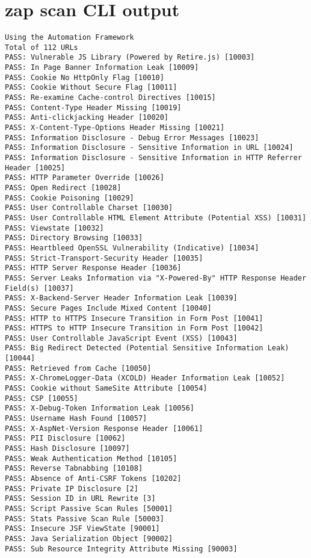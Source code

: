 \section{zap scan CLI output}
\vspace{2mm}
\begin{lstlisting}[caption=OWASP ZAP baseline scan, captionpos=b, frame=single, label={owasp-zap-cli-full-output}]
Using the Automation Framework
Total of 112 URLs
PASS: Vulnerable JS Library (Powered by Retire.js) [10003]
PASS: In Page Banner Information Leak [10009]
PASS: Cookie No HttpOnly Flag [10010]
PASS: Cookie Without Secure Flag [10011]
PASS: Re-examine Cache-control Directives [10015]
PASS: Content-Type Header Missing [10019]
PASS: Anti-clickjacking Header [10020]
PASS: X-Content-Type-Options Header Missing [10021]
PASS: Information Disclosure - Debug Error Messages [10023]
PASS: Information Disclosure - Sensitive Information in URL [10024]
PASS: Information Disclosure - Sensitive Information in HTTP Referrer Header [10025]
PASS: HTTP Parameter Override [10026]
PASS: Open Redirect [10028]
PASS: Cookie Poisoning [10029]
PASS: User Controllable Charset [10030]
PASS: User Controllable HTML Element Attribute (Potential XSS) [10031]
PASS: Viewstate [10032]
PASS: Directory Browsing [10033]
PASS: Heartbleed OpenSSL Vulnerability (Indicative) [10034]
PASS: Strict-Transport-Security Header [10035]
PASS: HTTP Server Response Header [10036]
PASS: Server Leaks Information via "X-Powered-By" HTTP Response Header Field(s) [10037]
PASS: X-Backend-Server Header Information Leak [10039]
PASS: Secure Pages Include Mixed Content [10040]
PASS: HTTP to HTTPS Insecure Transition in Form Post [10041]
PASS: HTTPS to HTTP Insecure Transition in Form Post [10042]
PASS: User Controllable JavaScript Event (XSS) [10043]
PASS: Big Redirect Detected (Potential Sensitive Information Leak) [10044]
PASS: Retrieved from Cache [10050]
PASS: X-ChromeLogger-Data (XCOLD) Header Information Leak [10052]
PASS: Cookie without SameSite Attribute [10054]
PASS: CSP [10055]
PASS: X-Debug-Token Information Leak [10056]
PASS: Username Hash Found [10057]
PASS: X-AspNet-Version Response Header [10061]
PASS: PII Disclosure [10062]
PASS: Hash Disclosure [10097]
PASS: Weak Authentication Method [10105]
PASS: Reverse Tabnabbing [10108]
PASS: Absence of Anti-CSRF Tokens [10202]
PASS: Private IP Disclosure [2]
PASS: Session ID in URL Rewrite [3]
PASS: Script Passive Scan Rules [50001]
PASS: Stats Passive Scan Rule [50003]
PASS: Insecure JSF ViewState [90001]
PASS: Java Serialization Object [90002]
PASS: Sub Resource Integrity Attribute Missing [90003]

\end{lstlisting}
